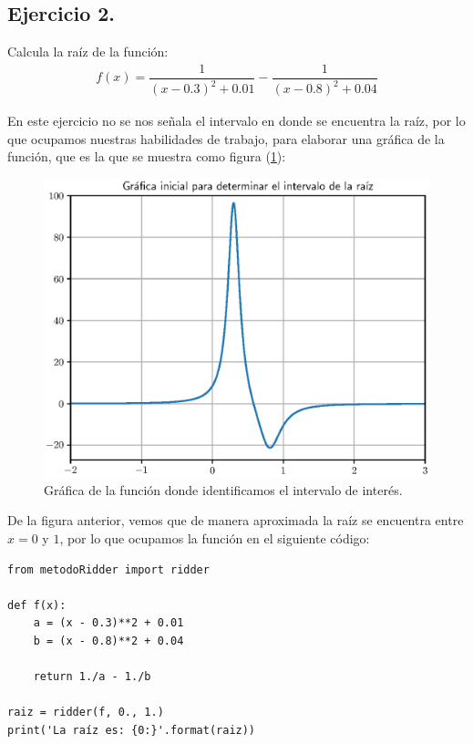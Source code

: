 \subsection{Ejercicio 2.}

Calcula la raíz de la función:
\begin{align*}
f (x) = \dfrac{1}{(x - 0.3)^{2} + 0.01} - \dfrac{1}{(x - 0.8)^{2} + 0.04}
\end{align*}

En este ejercicio no se nos señala el intervalo en donde se encuentra la raíz, por lo que ocupamos nuestras habilidades de trabajo, para elaborar una gráfica de la función, que es la que se muestra como figura (\ref{fig:figura_04}):
\begin{figure}[H]
    \centering
    \includegraphics[scale=0.75]{Imagenes/plot_Metodo_Ridder_Ejercicio_02_01.eps}
    \caption{Gráfica de la función donde identificamos el intervalo de interés.}
    \label{fig:figura_04}
\end{figure}
De la figura anterior, vemos que de manera aproximada la raíz se encuentra entre $x = 0$ y $1$, por lo que ocupamos la función  en el siguiente código:
\begin{verbatim}
from metodoRidder import ridder

def f(x):
    a = (x - 0.3)**2 + 0.01
    b = (x - 0.8)**2 + 0.04
    
    return 1./a - 1./b
  
raiz = ridder(f, 0., 1.)
print('La raíz es: {0:}'.format(raiz))
\end{verbatim}

